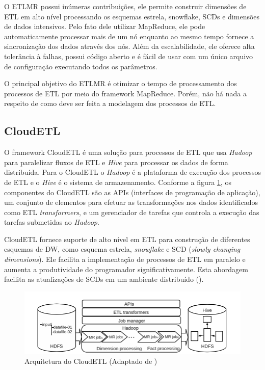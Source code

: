 O ETLMR possui inúmeras contribuições, ele permite construir dimensões de ETL em alto nível processando os esquemas estrela, snowflake, SCDs e dimensões de dados intensivos. Pelo fato dele utilizar MapReduce, ele pode automaticamente processar mais de um nó enquanto ao mesmo tempo fornece a sincronização dos dados através dos nós. Além da escalabilidade, ele oferece alta tolerância à falhas, possui código aberto e é fácil de usar com um único arquivo de configuração executando todos os parâmetros.

O principal objetivo do ETLMR é otimizar o tempo de processamento dos processos de ETL por meio do framework MapReduce. Porém, não há nada a respeito de como deve ser feita a modelagem dos processos de ETL.

\subsection{CloudETL}

O framework CloudETL é uma solução para processos de ETL que usa \textit{Hadoop} para paralelizar fluxos de ETL e \textit{Hive} para processar os dados de forma distribuída. Para o CloudETL o \textit{Hadoop} é a plataforma de execução dos processos de ETL e o \textit{Hive} é o sistema de armazenamento. Conforme a figura \ref{cloudetl}, os componentes do CloudETL são as APIs (interfaces de programação de aplicação), um conjunto de elementos para efetuar as transformações nos dados identificados como ETL \textit{transformers}, e um gerenciador de tarefas que controla a execução das tarefas submetidas ao \textit{Hadoop}. 

CloudETL fornece suporte de alto nível em ETL para construção de diferentes esquemas de DW, como esquema estrela, \textit{snowflake} e SCD (\textit{slowly changing dimensions}). Ele facilita a implementação de processos de ETL em paralelo e aumenta a produtividade do programador significativamente. Esta abordagem facilita as atualizações de SCDs em um ambiente distribuído (\cite{liu:2013}).

\begin{figure}[h]
	\centering
	\includegraphics[scale=0.9]{fig/cloudetl.png}
	\caption{Arquitetura do CloudETL (Adaptado de \cite{liu:2013})}
	\label{cloudetl}
\end{figure}

